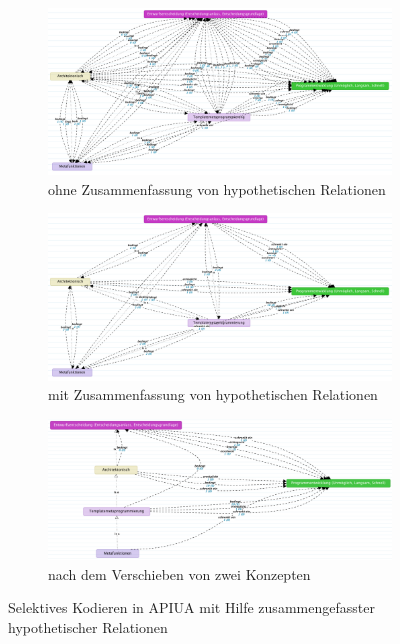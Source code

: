 \begin{figure}
        \centering
        \begin{subfigure}{0.43\linewidth}
                \includegraphics[width=\linewidth]{Figures/research/workflow-selectivecoding-a.png}
                  \caption{ohne Zusammenfassung von hypothetischen Relationen}
                \label{fig:research-workflow-selectivecoding-a}
        \end{subfigure}%
        \hfill%
        \begin{subfigure}{0.43\linewidth}%
                \includegraphics[width=\linewidth]{Figures/research/workflow-selectivecoding-b.png}
                \caption{mit Zusammenfassung von hypothetischen Relationen}
                \label{fig:research-workflow-selectivecoding-b}
        \end{subfigure}%
        \hfill%
        \begin{subfigure}{0.48\linewidth}%
                \includegraphics[width=\linewidth]{Figures/research/workflow-selectivecoding-c.png}
                \caption{nach dem Verschieben von zwei Konzepten}
                \label{fig:research-workflow-selectivecoding-c}
        \end{subfigure}%
        \caption{Selektives Kodieren in APIUA mit Hilfe zusammengefasster hypothetischer Relationen}%
        \label{fig:research-workflow-selectivecoding}
\end{figure}




